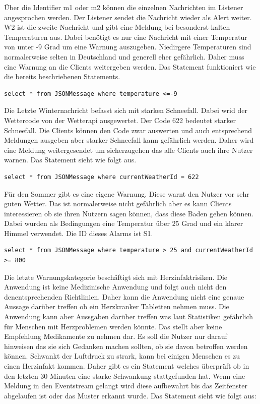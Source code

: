 Über die Identifier m1 oder m2 können die einzelnen Nachrichten im Listener angesprochen werden. Der Listener sendet die Nachricht wieder als Alert weiter. W2 ist die zweite Nachricht und gibt eine Meldung bei besonderst kalten Temperaturen aus. Dabei benötigt es nur eine Nachricht mit einer Temperatur von unter -9 Grad um eine Warnung auszugeben. Niedirgere Temperaturen sind normalerweise selten in Deutschland und generell eher gefährlich. Daher muss eine Warnung an die Clients weitergeben werden. Das Statement funktioniert wie die bereits beschriebenen Statements. 
\begin{lstlisting}
select * from JSONMessage where temperature <=-9
\end{lstlisting}
Die Letzte Winternachricht befasst sich mit starken Schneefall. Dabei wrid der Wettercode von der Wetterapi ausgewertet. Der Code 622 bedeutet starker Schneefall. Die Clients können den Code zwar auswerten und auch entsprechend Meldungen ausgeben aber starker Schneefall kann gefährlich werden. Daher wird eine Meldung weitergesendet um sicherzugehen das alle Clients auch ihre Nutzer warnen. Das Statement sieht wie folgt aus. 
\begin{lstlisting}
select * from JSONMessage where currentWeatherId = 622
\end{lstlisting}  
Für den Sommer gibt es eine eigene Warnung. Diese warnt den Nutzer vor sehr guten Wetter. Das ist normalerweise nicht gefährlich aber es kann Clients interessieren ob sie ihren Nutzern sagen können, dass diese Baden gehen können. Dabei wurden als Bedingungen eine Temperatur über 25 Grad und ein klarer Himmel verwendet. Die ID dieses Alarms ist S1. 
\begin{lstlisting}
select * from JSONMessage where temperature > 25 and currentWeatherId >= 800
\end{lstlisting}
Die letzte Warnungskategorie beschäftigt sich mit Herzinfaktrisiken. Die Anwendung ist keine Medizinische Anwendung und folgt auch nicht den denentsprechenden Richtlinien. Daher kann die Anwendung nicht eine genaue Aussage darüber treffen ob ein Herzkranker Tabletten nehmen muss. Die Anwendung kann aber Aussgaben darüber treffen was laut Statistiken gefährlich für Menschen mit Herzproblemen werden könnte. Das stellt aber keine Empfehlung Medikamente zu nehmen dar. Es soll die Nutzer nur darauf hinweisen das sie sich Gedanken machen sollten, ob sie davon betroffen werden können. 
 Schwankt der Luftdruck zu strark, kann bei einigen Menschen es zu einen Herzinfakt kommen. Daher gibt es ein Statement welches überprüft ob in den letzten 30 Minuten eine starke Schwankung stattgefunden hat. Wenn eine Meldung in den Eventstream gelangt wird diese aufbewahrt bis das Zeitfenster abgelaufen ist oder das Muster erkannt wurde. Das Statement sieht wie folgt aus:

